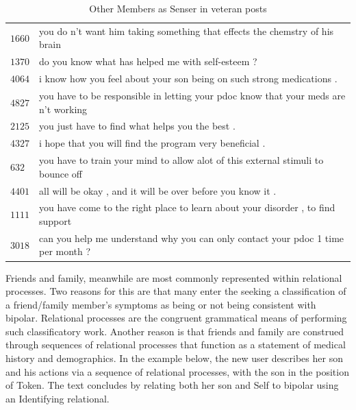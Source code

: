 \begin{table}[htb]
  \centering
  \small
  \begin{tabular}{ll}
  
  \toprule
  $1660$ &  you do n't want him taking something that effects the chemstry of his brain  \\
  $1370$ &  do you know what has helped me with self-esteem ?                                                \\
  $4064$ &  i know how you feel about your son being on such strong medications .                            \\
  $4827$ &  you have to be responsible in letting your pdoc know that your meds are n't working  \\
  $2125$ &  you just have to find what helps you the best .                                                  \\
  $4327$ &  i hope that you will find the program very beneficial .                                          \\
  $632 $ &  you have to train your mind to allow alot of this external stimuli to bounce off  \\
  $4401$ &  all will be okay , and it will be over before you know it .                                      \\
  $1111$ &  you have come to the right place to learn about your disorder , to find support  \\
  $3018$ &  can you help me understand why you can only contact your pdoc 1 time per month ?                 \\
  \bottomrule
  \end{tabular}
  \caption{Other Members as Senser in veteran posts}
  \label{conc:others-in-mental}
  \end{table}

Friends and family, meanwhile are most commonly represented within relational processes. Two reasons for this are that many  enter the  seeking a classification of a friend\slash family member's symptoms as being or not being consistent with \gls{bipolar}. Relational processes are the congruent grammatical means of performing such classificatory work. Another reason is that friends and family are construed through sequences of relational processes that function as a statement of medical history and demographics. In the example below, the new user describes her son and his actions via a sequence of relational processes, with the son in the position of Token. The text concludes by relating both her son and Self to \Gls{bipolar} using an Identifying relational.

